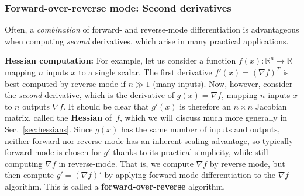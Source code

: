 \subsubsection{Forward-over-reverse mode: Second derivatives}
\label{sec:forward-over-reverse}

Often, a \emph{combination} of forward- and reverse-mode differentiation is advantageous when computing \emph{second} derivatives, which arise in many practical applications.

\textbf{Hessian computation:}
For example, let us consider a function $f(x): \mathbb{R}^n \to \mathbb{R}$ mapping $n$ inputs $x$ to a single scalar.  The first derivative $f'(x) = (\nabla f)^T$ is best computed by reverse mode if $n \gg 1$ (many inputs).   Now, however, consider the \emph{second} derivative, which is the derivative of $g(x) = \nabla f$, mapping $n$ inputs $x$ to $n$ outputs $\nabla f$.   It should be clear that $g'(x)$ is therefore an $n \times n$ Jacobian matrix, called the \textbf{Hessian} of~$f$, which we will discuss much more generally in Sec.~\ref{sec:hessians}.  Since $g(x)$ has the same number of inputs and outputs, neither forward nor reverse mode has an inherent scaling advantage, so typically forward mode is chosen for $g'$ thanks to its practical simplicity, while still computing $\nabla f$ in reverse-mode.  That is, we compute $\nabla f$ by reverse mode, but then compute $g' = (\nabla f)'$ by applying forward-mode differentiation to the $\nabla f$ algorithm.  This is called a \textbf{forward-over-reverse} algorithm.

